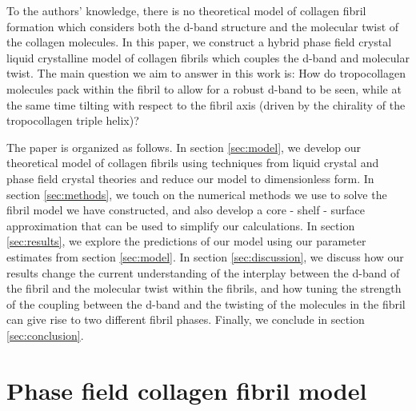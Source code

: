 \documentclass[%
 reprint,
 amsmath,amssymb,
 aps,
]{revtex4-1}
\begin{document}
To the authors' knowledge, there is no theoretical model of collagen fibril formation which considers both the d-band structure and the molecular twist of the collagen molecules. In this paper, we construct a hybrid phase field crystal liquid crystalline model of collagen fibrils which couples the d-band and molecular twist. The main question we aim to answer in this work is: How do tropocollagen molecules pack within the fibril to allow for a robust d-band to be seen, while at the same time tilting with respect to the fibril axis (driven by the chirality of the tropocollagen triple helix)?

The paper is organized as follows. In section \ref{sec:model}, we develop our theoretical model of collagen fibrils using techniques from liquid crystal and phase field crystal theories and reduce our model to dimensionless form. In section \ref{sec:methods}, we touch on the numerical methods we use to solve the fibril model we have constructed, and also develop a core - shelf - surface approximation that can be used to simplify our calculations. In section \ref{sec:results}, we explore the predictions of our model using our parameter estimates from section \ref{sec:model}. In section \ref{sec:discussion}, we discuss how our results change the current understanding of the interplay between the d-band of the fibril and the molecular twist within the fibrils, and how tuning the strength of the coupling between the d-band and the twisting of the molecules in the fibril can give rise to two different fibril phases. Finally, we conclude in section \ref{sec:conclusion}.

\section{\label{sec:model}Phase field collagen fibril model}
\end{document}
